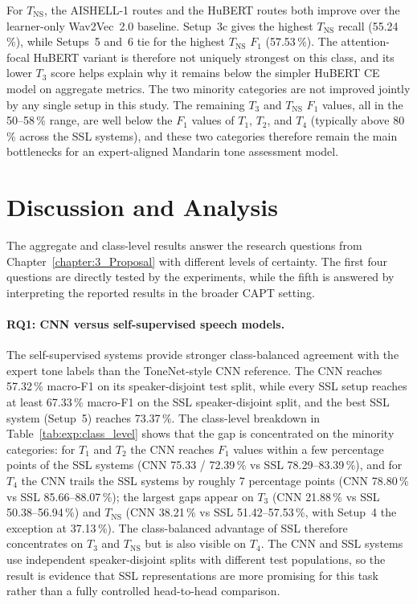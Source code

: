 For \(T_{\mathrm{NS}}\), the AISHELL-1 routes and the HuBERT routes both improve
over the learner-only Wav2Vec~2.0 baseline. Setup~3c gives the highest
\(T_{\mathrm{NS}}\) recall (55.24\,\%), while Setups~5 and~6 tie for the highest
\(T_{\mathrm{NS}}\) \(F_1\) (57.53\,\%). The attention-focal HuBERT variant is
therefore not uniquely strongest on this class, and its lower \(T_3\) score
helps explain why it remains below the simpler HuBERT CE model on aggregate
metrics. The two minority categories are not improved jointly by any single
setup in this study. The remaining \(T_3\) and \(T_{\mathrm{NS}}\) \(F_1\) values,
all in the 50--58\,\% range, are well
below the \(F_1\) values of \(T_1\), \(T_2\), and \(T_4\) (typically above
80\,\% across the SSL systems), and these two categories therefore remain
the main bottlenecks for an expert-aligned Mandarin tone assessment model.

\section{Discussion and Analysis}
\label{sec:exp:interpretation}

The aggregate and class-level results answer the research questions from
Chapter~\ref{chapter:3_Proposal} with different levels of certainty. The first
four questions are directly tested by the experiments, while the fifth is
answered by interpreting the reported results in the broader CAPT setting.

\paragraph{RQ1: CNN versus self-supervised speech models.}
The self-supervised systems provide stronger class-balanced agreement with
the expert tone labels than the ToneNet-style CNN reference. The CNN reaches
57.32\,\% macro-F1 on its speaker-disjoint test split, while every SSL setup
reaches at least 67.33\,\% macro-F1 on the SSL speaker-disjoint split, and
the best SSL system (Setup~5) reaches 73.37\,\%. The class-level breakdown in
Table~\ref{tab:exp:class_level} shows that the gap is concentrated on the
minority categories: for \(T_1\) and \(T_2\) the CNN reaches \(F_1\) values
within a few percentage points of the SSL systems
(CNN 75.33 / 72.39\,\% vs SSL 78.29--83.39\,\%), and for \(T_4\) the CNN
trails the SSL systems by roughly 7 percentage points (CNN 78.80\,\% vs
SSL 85.66--88.07\,\%); the largest gaps appear on \(T_3\)
(CNN 21.88\,\% vs SSL 50.38--56.94\,\%) and \(T_{\mathrm{NS}}\)
(CNN 38.21\,\% vs SSL 51.42--57.53\,\%, with Setup~4 the exception at
37.13\,\%). The class-balanced advantage of SSL therefore concentrates on
\(T_3\) and \(T_{\mathrm{NS}}\) but is also visible on \(T_4\). The CNN and
SSL systems use independent speaker-disjoint splits with different test
populations, so the result is evidence that SSL representations are more
promising for this task rather than a fully controlled head-to-head
comparison.

